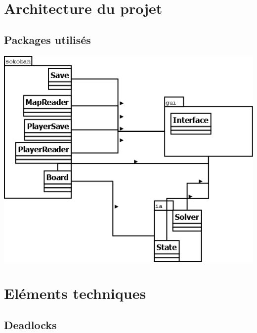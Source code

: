 \documentclass{beamer}
\begin{document}
\section{Architecture du projet}
\subsection{Packages utilisés}
\begin{frame}
\begin{center}
\includegraphics[scale=0.3]{images/packages.png}
\end{center}
\end{frame}

\section{Eléments techniques}
\subsection{Deadlocks}
\end{document}
